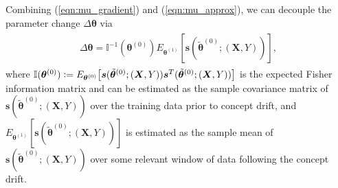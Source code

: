 \documentclass[twoside,11pt]{article}
\begin{document}
Combining (\ref{eqn:mu_gradient}) and (\ref{eqn:mu_approx}), we can decouple the parameter change $\Delta \bm { \theta}$ via 
\begin{align}
\begin{aligned}
 \Delta \bm { \theta} = \mathbb {I}^{-1}(\bm { \theta}^{ (0)}) E_{\bm{ \theta}^{ (1)}}[\bm{s}(\tilde{ \bm { \theta}} ^{ (0)}; (\bm {X}, Y))], 
\end{aligned}
\label{eqn:decouple}
\end{align}
where $\mathbb {I}(\bm { \theta}^{ (0)}) \vcentcolon= E_{\bm { \theta}^{(0)}} \big[ \bm{s}( \tilde{ \bm { \theta}} ^{ (0)}; (\bm {X}, Y)) \bm{s}^T(\tilde{ \bm { \theta}} ^{ (0)};(\bm{X},Y)) \big]$ is the expected Fisher information matrix and can be estimated as the sample covariance matrix of $\bm{s}(\tilde{ \bm { \theta}} ^{ (0)}; (\bm {X}, Y))$ over the training data prior to concept drift, and $E_{\bm{ \theta}^{ (1)}} [\bm{s}(\tilde{ \bm { \theta}} ^{ (0)}; (\bm {X}, Y))]$ is estimated as the sample mean of $\bm{s}(\tilde{ \bm { \theta}} ^{ (0)}; (\bm {X}, Y))$ over some relevant window of data following the concept drift. 
\end{document}
